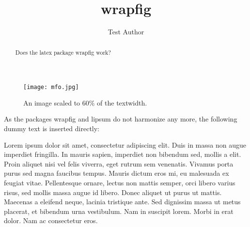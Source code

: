 \documentclass{snapshotmfo}
\author{Test Author}
\title{wrapfig}
\begin{document}

\begin{abstract}
Does the latex package wrapfig work?
\end{abstract}

\begin{wrapfigure}{I}{0.6\textwidth}
\centering
\texttt{[image: mfo.jpg]}
\caption{An image scaled to 60\% of the textwidth.}
\end{wrapfigure}

As the packages wrapfig and lipsum do not harmonize any more,
the following dummy text is inserted directly:

Lorem ipsum dolor sit amet, consectetur adipiscing elit. Duis in massa non
augue imperdiet fringilla. In mauris sapien, imperdiet non bibendum sed,
mollis a elit. Proin aliquet nisi vel felis viverra, eget rutrum sem venenatis.
Vivamus porta purus sed magna faucibus tempus. Mauris dictum eros mi, eu
malesuada ex feugiat vitae. Pellentesque ornare, lectus non mattis semper,
orci libero varius risus, sed mollis massa augue id libero. Donec aliquet ut
purus ut mattis. Maecenas a eleifend neque, lacinia tristique ante. Sed
dignissim massa ut metus placerat, et bibendum urna vestibulum. Nam in suscipit
lorem. Morbi in erat dolor. Nam ac consectetur eros.
\end{document}
